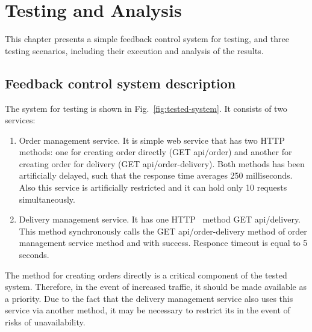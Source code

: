 \chapter{Testing and Analysis}
\label{ch:testing}
\newcommand{\code}[1]{\colorbox{light-gray}{\texttt{#1}}}

This chapter presents a simple feedback control system for testing, and three testing scenarios, including their execution and analysis of the results.

\section{Feedback control system description}\label{sec:test_system_description}
The system for testing is shown in Fig.~\ref{fig:tested-system}. It consists of two services:
\begin{enumerate}
    \item Order management service. It is simple web service that has two HTTP~\cite{http} methods: one for creating order directly (GET api/order) and another for creating order for delivery (GET api/order-delivery). Both methods has been artificially delayed, such that the response time averages 250 milliseconds. Also this service is artificially restricted and it can hold only 10 requests simultaneously.
    \item Delivery management service. It has one HTTP~\cite{http} method GET api/delivery. This method synchronously calls the GET api/order-delivery method of order management service method and with success. Responce timeout is equal to 5 seconds.
\end{enumerate}

The method for creating orders directly is a critical component of the tested system.
Therefore, in the event of increased traffic, it should be made available as a priority. Due to the fact that the delivery management service also uses this service via another method, it may be necessary to restrict its in the event of risks of unavailability.

